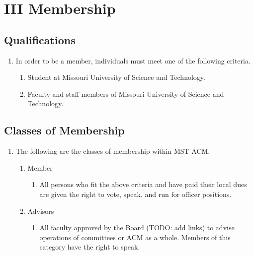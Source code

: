 
\section{III \textendash{} Membership}
  \subsection{Qualifications}
    \begin{enumerate}[label=\alph*.]
      \item In order to be a member, individuals must meet one of the following
      criteria.
        \begin{enumerate}[label=\arabic*.]
          \item Student at Missouri University of Science and Technology.
          \item Faculty and staff members of Missouri University of Science and
          Technology.
        \end{enumerate}
    \end{enumerate}
  \subsection{Classes of Membership}
    \begin{enumerate}[label=\arabic*.]
      \item The following are the classes of membership within MST ACM.
        \begin{enumerate}[label=\alph*.]
          \item Member
            \begin{enumerate}[label=\arabic*.]
              \item All persons who fit the above criteria and have paid their
              local dues are given the right to vote, speak, and run for officer
              positions.
            \end{enumerate}
          \item Advisors
            \begin{enumerate}[label=\alph*.]
              \item All faculty approved by the Board (TODO: add links) to
              advise operations of committees or ACM as a whole. Members of this
              category have the right to speak.
            \end{enumerate}
        \end{enumerate}
    \end{enumerate}


